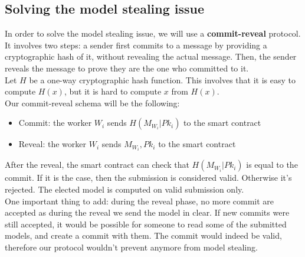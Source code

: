 \documentclass{article}
\begin{document}
\subsection{Solving the model stealing issue}
In order to solve the model stealing issue, we will use a \textbf{commit-reveal} protocol. It involves two steps:
a sender first commits to a message by providing a cryptographic hash of it, without revealing the actual message.
Then, the sender reveals the message to prove they are the one who committed to it.\\
Let $H$ be a one-way cryptographic hash function. This involves that it is easy to compute $H(x)$, but it is hard to
compute $x$ from $H(x)$.\\
Our commit-reveal schema will be the following:
\begin{itemize}
    \item Commit: the worker $W_i$ sends $H(M_{W_i}|Pk_i)$ to the smart contract
    \item Reveal: the worker $W_i$ sends $M_{W_i},Pk_i$ to the smart contract
\end{itemize}
After the reveal, the smart contract can check that $H(M_{W_i}|Pk_i)$ is equal to the commit. If it is the case, then
the submission is considered valid. Otherwise it's rejected. The elected model is computed on valid submission only.\\
One important thing to add: during the reveal phase, no more commit are accepted as during the reveal we send
the model in clear. If new commits were still accepted, it would be possible for someone to read some of the submitted
models, and create a commit with them. The commit would indeed be valid, therefore our protocol wouldn't prevent anymore
from model stealing.
\end{document}
